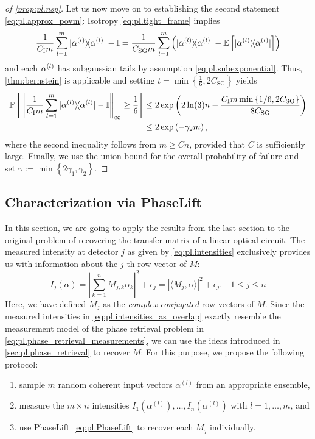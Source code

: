 \begin{proof}[of \cref{prop:pl.nsp}]
  Let us now move on to establishing the second statement \eqref{eq:pl.approx_povm}:
  Isotropy \eqref{eq:pl.tight_frame} implies
  \begin{align}
    \frac{1}{ C_\mathrm{I} m} \sum_{l=1}^m \ketbra{\alpha\ind{l}} - \mathbb{I}
    = \frac{1}{C_\mathrm{SG} m} \sum_{l=1}^m \left( \ketbra{\alpha\ind{l}} - \mathbb{E} \left[ \ketbra{\alpha\ind{l}} \right] \right)
  \end{align}
  and each $\alpha^{(l)}$ has subgaussian tails by assumption \eqref{eq:pl.subexponential}.
  Thus, \cref{thm:bernstein} is applicable and setting $t= \min \left\{\frac{1}{6},2 C_\mathrm{SG} \right\}$ yields
  \begin{align}
    \Prob \left[ \left\| \frac{1}{C_\mathrm{I} m} \sum_{l=1}^m \ketbra{\alpha\ind{l}} -  \mathbb{I} \right\|_\infty \geq \frac{1}{6} \right]
    & \leq 2 \exp \left( 2 \ln (3) n - \frac{C_\mathrm{I} m \min\left\{ 1/6, 2 C_\mathrm{SG} \right\}}{8 C_\mathrm{SG}} \right) \\
    & \leq 2 \exp \left( - \gamma_2 m \right),
  \end{align}
  where the second inequality follows from $m \geq C n$, provided that $C$ is sufficiently large.
  Finally, we use the union bound  for the overall probability of failure and set $\gamma := \min \left\{ 2 \gamma_1,\gamma_2 \right\}$.
\end{proof}


\subsection{Characterization via PhaseLift}%
\label{sub:pl.characterization}

In this section, we are going to apply the results from the last section to the original problem of recovering the transfer matrix of a linear optical circuit.
The measured intensity at detector $j$ as given by \cref{eq:pl.intensities} exclusively provides us with information about the $j$-th row vector of ${M}$:
\[
  I_j({\alpha})
  = \left| \sum_{k=1}^n M_{j,k} \alpha_k \right|^2 + \epsilon_j
  = \left\vert  \langle {M}_j, \alpha \rangle  \right\vert^2 + \epsilon_j. \quad 1 \leq j \leq n
  \label{eq:pl.intensities_as_overlap}
\]
Here, we have defined ${M}_j$ as the \emph{complex conjugated} row vectors of ${M}$.
Since the measured intensities in \cref{eq:pl.intensities_as_overlap} exactly resemble the measurement model of the phase retrieval problem in \cref{eq:pl.phase_retrieval_measurements}, we can use the ideas introduced in \cref{sec:pl.phase_retrieval} to recover $M$:
For this purpose, we propose the following protocol:
\begin{enumerate}
  \item sample $m$ random coherent input vectors $\alpha^{(l)}$ from an appropriate ensemble,
  \item measure the $m \times n$ intensities $I_1(\alpha^{(l)}), \ldots, I_n ( \alpha^{(l)})$ with $l=1,\ldots,m$, and
  \item use PhaseLift~\eqref{eq:pl.PhaseLift} to recover each ${M}_j$ individually.
\end{enumerate}

